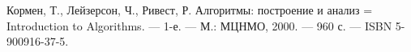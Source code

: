 \begin{thebibliography}{99}
Кормен, Т., Лейзерсон, Ч., Ривест, Р. Алгоритмы: построение и анализ = Introduction to Algorithms. — 1-е. — М.: МЦНМО, 2000. — 960 с. — ISBN 5-900916-37-5.
\end{thebibliography}
